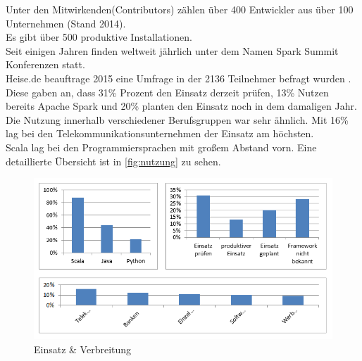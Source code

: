 \noindent
Unter den Mitwirkenden(Contributors) zählen über 400 Entwickler aus über 100 Unternehmen (Stand 2014).\\
Es gibt über 500 produktive Installationen. \cite{ADD+15} \\ %

\noindent
Seit einigen Jahren finden weltweit jährlich unter dem Namen Spark Summit Konferenzen statt. \cite{SPCOM}\\



\noindent
Heise.de beauftrage 2015 eine Umfrage in der 2136 Teilnehmer befragt wurden \cite{HEISEBIGDATA}. Diese gaben an, dass 31\% Prozent den Einsatz derzeit prüfen, 13\% Nutzen bereits Apache Spark und 20\% planten den Einsatz noch in dem damaligen Jahr. Die Nutzung innerhalb verschiedener Berufsgruppen war sehr ähnlich. Mit 16\%  lag bei den Telekommunikationsunternehmen der Einsatz am höchsten.\\
Scala lag bei den Programmiersprachen mit großem Abstand vorn. Eine detaillierte Übersicht ist in \autoref{fig:nutzung} zu sehen.
\begin{figure}[h]
  \centering
  \includegraphics[width=\textwidth]{./excel/Nutzung.png}
  \caption{Einsatz \& Verbreitung}\label{fig:nutzung}
\end{figure}




